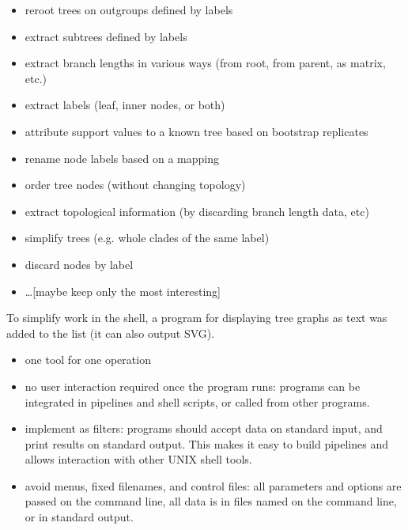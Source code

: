 \documentclass[a4paper,10pt]{article}
\begin{document}
\begin{itemize}
 \item reroot trees on outgroups defined by labels
 \item extract subtrees defined by labels
 \item extract branch lengths in various ways (from root, from parent, as matrix, etc.)
 \item extract labels (leaf, inner nodes, or both)
 \item attribute support values to a known tree based on bootstrap replicates
 \item rename node labels based on a mapping
 \item order tree nodes (without changing topology)
 \item extract topological information (by discarding branch length data, etc)
 \item simplify trees (e.g. whole clades of the same label)
 \item discard nodes by label
 \item \ldots [maybe keep only the most interesting]
\end{itemize}

To simplify work in the shell, a program for displaying tree graphs as text was added to the list (it can also output SVG).

\begin{itemize}
 \item one tool for one operation
 \item no user interaction required once the program runs: programs can be
 integrated in pipelines and shell scripts, or called from other programs.
 \item implement as filters: programs should accept data on standard input, and print results on standard output. This makes it easy to build pipelines and allows interaction with other UNIX shell tools.
 \item avoid menus, fixed filenames, and control files: all parameters and options are passed on the command line, all data is in files named on the command line, or in standard output.
\end{itemize}
\end{document}

